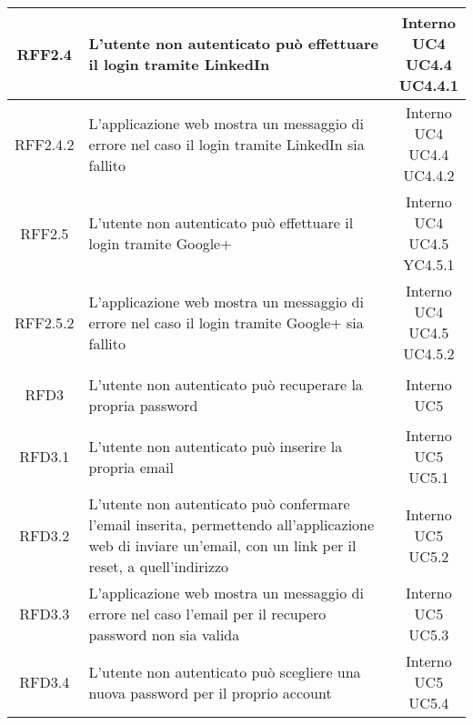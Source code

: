 \begin{longtable}{|c|p{8cm}|c|}
\hypertarget{RFF2.4}{RFF2.4} & L'utente non autenticato può effettuare il login tramite LinkedIn & \makecell*{Interno\\UC4\\UC4.4\\UC4.4.1} \\
\hline
\hypertarget{RFF2.4.2}{RFF2.4.2} & L'applicazione web mostra un messaggio di errore nel caso il login tramite LinkedIn sia fallito & \makecell*{Interno\\UC4\\UC4.4\\UC4.4.2} \\
\hline

\hypertarget{RFF2.5}{RFF2.5} & L'utente non autenticato può effettuare il login tramite Google+ & \makecell*{Interno\\UC4\\UC4.5\\YC4.5.1} \\
\hline
\hypertarget{RFF2.5.2}{RFF2.5.2} & L'applicazione web mostra un messaggio di errore nel caso il login tramite Google+ sia fallito & \makecell*{Interno\\UC4\\UC4.5\\UC4.5.2} \\
\hline

\hypertarget{RFD3}{RFD3} & L'utente non autenticato può recuperare la propria password & \makecell*{Interno\\UC5} \\
\hline

\hypertarget{RFD3.1}{RFD3.1} & L'utente non autenticato può inserire la propria email & \makecell*{Interno\\UC5\\UC5.1} \\
\hline
\hypertarget{RFD3.2}{RFD3.2} & L'utente non autenticato può confermare l'email inserita, permettendo all'applicazione web di inviare un'email, con un link per il reset, a quell'indirizzo & \makecell*{Interno\\UC5\\UC5.2} \\
\hline
\hypertarget{RFD3.3}{RFD3.3} & L'applicazione web mostra un messaggio di errore nel caso l'email per il recupero password non sia valida & \makecell*{Interno\\UC5\\UC5.3} \\
\hline
\hypertarget{RFD3.4}{RFD3.4} & L'utente non autenticato può scegliere una nuova password per il proprio account & \makecell*{Interno\\UC5\\UC5.4} \\
\hline


\end{longtable}
